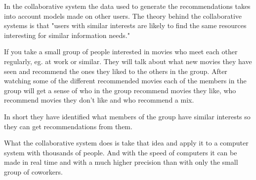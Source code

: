 In the collaborative system the data used to generate the recommendations takes into account models made on other users. The theory behind the collaborative systems is that "users with similar interests are likely to find the same resources interesting for similar information needs." \cite{TheAdaptiveWeb}

If you take a small group of people interested in movies who meet each other regularly, eg. at work or similar. They will talk about what new movies they have seen and recommend the ones they liked to the others in the group. After watching some of the different recommended movies each of the members in the group will get a sense of who in the group recommend movies they like, who recommend movies they don't like and who recommend a mix.

In short they have identified what members of the group have similar interests so they can get recommendations from them.

What the collaborative system does is take that idea and apply it to a computer system with thousands of people. And with the speed of computers it can be made in real time and with a much higher precision than with only the small group of coworkers.
